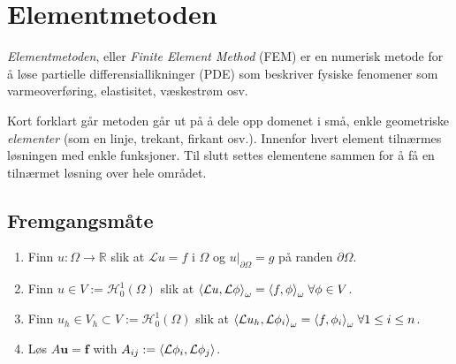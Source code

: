\chapter{Elementmetoden}

\emph{Elementmetoden}, eller \emph{Finite Element Method} (FEM) er en numerisk metode for å løse partielle differensiallikninger (PDE) som beskriver fysiske fenomener som varmeoverføring, elastisitet, væskestrøm osv.

Kort forklart går metoden går ut på å dele opp domenet i små, enkle geometriske \emph{elementer} (som en linje, trekant, firkant osv.).
Innenfor hvert element tilnærmes løsningen med enkle funksjoner.
Til slutt settes elementene sammen for å få en tilnærmet løsning over hele området.

\section{Fremgangsmåte}
\begin{enumerate}
    \item Finn \(u: \Omega \rightarrow \mathbb{R}\) slik at \(\mathcal{L} u = f\) i \(\Omega\) og \(u\big|_{\partial\Omega} = g\) på randen \(\partial\Omega\).

    \item Finn \(u \in V := \mathcal{H}_0^1(\Omega)\) slik at \(\inner*{\mathcal{L} u,\mathcal{L} \phi}_\omega = \inner*{f, \phi}_\omega \; \forall \phi \in V\).

    \item Finn \(u_h \in V_h \subset V := \mathcal{H}_0^1(\Omega)\) slik at \(\inner*{\mathcal{L} u_h,\mathcal{L} \phi_i}_\omega = \inner*{f, \phi_i}_\omega \; \forall 1\leq i \leq n\).

    \item Løs \(A\symbf{u} = \symbf{f}\) with \(A_{ij} := \inner*{\mathcal{L} \phi_i, \mathcal{L} \phi_j}\).
\end{enumerate}

